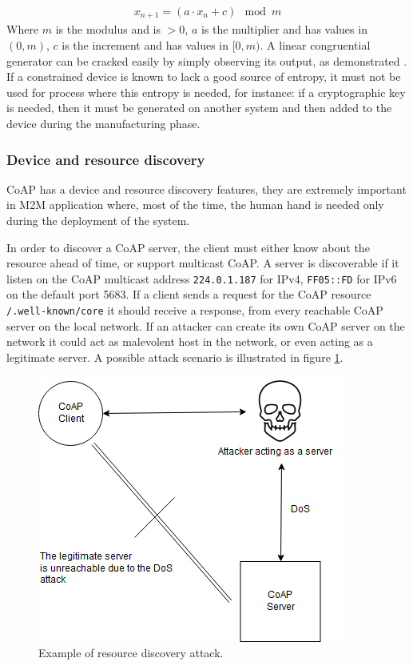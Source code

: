 	\begin{align*}
	x_{n+1}=(a\cdot x_n+c)\mod m
	\end{align*}
	Where $m$ is the modulus and is $>0$, $a$ is the multiplier and has values in $(0,m)$, $c$ is the increment and has values in $[0,m)$.
	A linear congruential generator can be cracked easily by simply observing its output, as demonstrated \cite{rng}. \newline
	If a constrained device is known to lack a good source of entropy, it must not be used for process where this entropy is needed, for instance: if a cryptographic key is needed, then it must be generated on another system and then added to the device during the manufacturing phase.
	
	\subsubsection{Device and resource discovery}
	CoAP has a device and resource discovery features, they are extremely important in M2M application where, most of the time, the human hand is needed only during the deployment of the system.\newline
	
	In order to discover a CoAP server, the client must either know about the resource ahead of time, or support multicast CoAP.\newline
	A server is discoverable if it listen on the CoAP multicast address \texttt{224.0.1.187} for IPv4, \texttt{FF05::FD} for IPv6 on the default port 5683.\newline
	If a client sends a request for the CoAP resource \texttt{/.well-known/core} it should receive a response, from every reachable CoAP server on the local network.
	If an attacker can create its own CoAP server on the network it could act as malevolent host in the network, or even acting as a legitimate server.
	A possible attack scenario is illustrated in figure \ref{fig:coap-vuln5}.
	
	\begin{figure}
		\includegraphics[width=\linewidth]{coap-vuln-img5.png}
		\caption{Example of resource discovery attack.}
		\label{fig:coap-vuln5}
	\end{figure}
	
